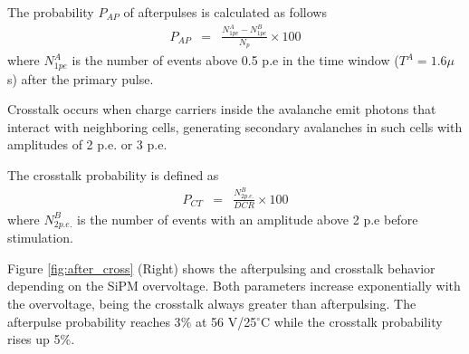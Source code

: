 \documentclass[a4paper,11pt]{article}
\begin{document}


The probability $P_{AP}$ of afterpulses is calculated as follows
\begin{eqnarray}
    P_{AP} &=& \frac{N_{1pe}^A-N_{1pe}^B}{N_p}\times 100
    \label{AP_eq}
\end{eqnarray}
where $N_{1pe}^A$ is the number of events above 0.5 p.e in the time window ($T^A = 1.6 \mu$ s) after the primary pulse. 

Crosstalk occurs when charge carriers inside the avalanche emit photons that interact with neighboring cells, generating secondary avalanches in such cells with amplitudes of 2 p.e. or 3 p.e.



The crosstalk probability is defined as
\begin{eqnarray}
    P_{CT} &=&\frac{N_{2p.e.}^B}{DCR}\times 100
    \label{CT_eq}
\end{eqnarray}
where $N_{2p.e.}^B$ is the number of events with an amplitude above 2 p.e before stimulation.

Figure \ref{fig:after_cross} (Right) shows the afterpulsing and crosstalk behavior depending on the SiPM overvoltage. Both parameters increase exponentially with the overvoltage, being the crosstalk always greater than afterpulsing. The afterpulse probability reaches 3$\%$ at 56 V/25$^{\circ}$C while the crosstalk probability rises up 5$\%$.
\end{document}
